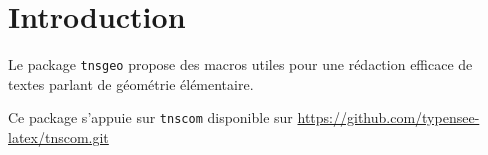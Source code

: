 \documentclass[12pt,a4paper]{article}
\begin{document}
\section{Introduction}

Le package \verb+tnsgeo+ propose des macros utiles pour une rédaction efficace de textes parlant de géométrie élémentaire.

\begin{remark}
	Ce package s'appuie sur \verb+tnscom+ disponible sur \url{https://github.com/typensee-latex/tnscom.git}
\end{remark}
\end{document}
